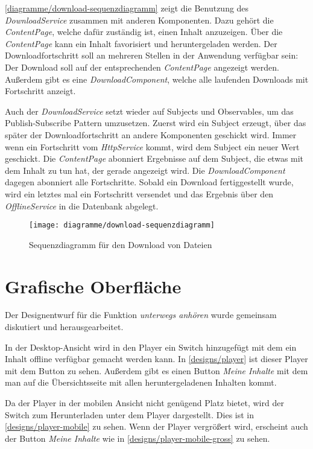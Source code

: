 \autoref{diagramme/download-sequenzdiagramm} zeigt die Benutzung des \textit{DownloadService} zusammen mit anderen Komponenten. Dazu gehört die \textit{ContentPage}, welche dafür zuständig ist, einen Inhalt anzuzeigen. Über die \textit{ContentPage} kann ein Inhalt favorisiert und heruntergeladen werden. Der Downloadfortschritt soll an mehreren Stellen in der Anwendung verfügbar sein: Der Download soll auf der entsprechenden \textit{ContentPage} angezeigt werden. Außerdem gibt es eine \textit{DownloadComponent}, welche alle laufenden Downloads mit Fortschritt anzeigt. 

Auch der \textit{DownloadService} setzt wieder auf Subjects und Observables, um das Publish-Subscribe Pattern umzusetzen. Zuerst wird ein Subject erzeugt, über das später der Downloadfortschritt an andere Komponenten geschickt wird. Immer wenn ein Fortschritt vom \textit{HttpService} kommt, wird dem Subject ein neuer Wert geschickt. Die \textit{ContentPage} abonniert Ergebnisse auf dem Subject, die etwas mit dem Inhalt zu tun hat, der gerade angezeigt wird. Die \textit{DownloadComponent} dagegen abonniert alle Fortschritte. Sobald ein Download fertiggestellt wurde, wird ein letztes mal ein Fortschritt versendet und das Ergebnis über den \textit{OfflineService} in die Datenbank abgelegt.

\begin{sidewaysfigure}
 \texttt{[image: diagramme/download-sequenzdiagramm]}
  \caption{Sequenzdiagramm für den Download von Dateien}
  \label{diagramme/download-sequenzdiagramm}
\end{sidewaysfigure}

\section{Grafische Oberfläche}
Der Designentwurf für die Funktion \textit{unterwegs anhören} wurde gemeinsam diskutiert und herausgearbeitet. 

In der Desktop-Ansicht wird in den Player ein Switch hinzugefügt mit dem ein Inhalt offline verfügbar gemacht werden kann. In \autoref{designs/player} ist dieser Player mit dem Button zu sehen. Außerdem gibt es einen Button \textit{Meine Inhalte} mit dem man auf die Übersichtsseite mit allen heruntergeladenen Inhalten kommt.


Da der Player in der mobilen Ansicht nicht genügend Platz bietet, wird der Switch zum Herunterladen unter dem Player dargestellt. Dies ist in \autoref{designs/player-mobile} zu sehen. Wenn der Player vergrößert wird, erscheint auch der Button \textit{Meine Inhalte} wie in \autoref{designs/player-mobile-gross} zu sehen.

